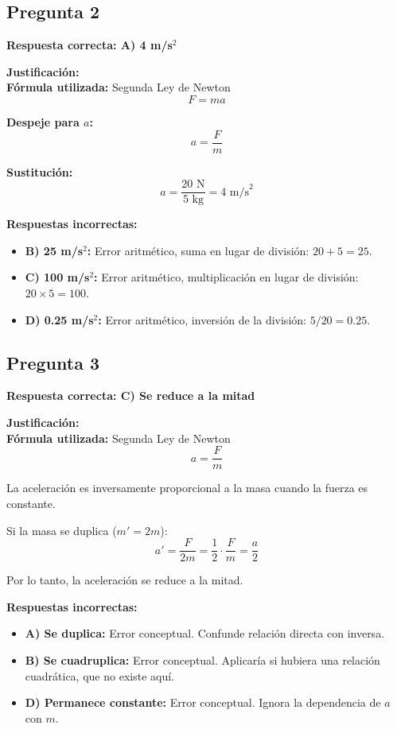 \begin{respuestabox}

\subsection{Pregunta 2}
\textcolor{verdecorrecto}{\textbf{Respuesta correcta: A) 4 m/s$^2$}}

\textbf{Justificación:}\\
\textbf{Fórmula utilizada:} Segunda Ley de Newton
$$F = ma$$

\textbf{Despeje para $a$:}
$$a = \frac{F}{m}$$

\textbf{Sustitución:}
$$a = \frac{20 \text{ N}}{5 \text{ kg}} = 4 \text{ m/s}^2$$

\textbf{Respuestas incorrectas:}
\begin{itemize}
    \item \textbf{B) 25 m/s$^2$:} Error aritmético, suma en lugar de división: $20 + 5 = 25$.
    \item \textbf{C) 100 m/s$^2$:} Error aritmético, multiplicación en lugar de división: $20 \times 5 = 100$.
    \item \textbf{D) 0.25 m/s$^2$:} Error aritmético, inversión de la división: $5/20 = 0.25$.
\end{itemize}
\end{respuestabox}
\newpage
\begin{respuestabox}

\subsection{Pregunta 3}
\textcolor{verdecorrecto}{\textbf{Respuesta correcta: C) Se reduce a la mitad}}

\textbf{Justificación:}\\
\textbf{Fórmula utilizada:} Segunda Ley de Newton
$$a = \frac{F}{m}$$

La aceleración es inversamente proporcional a la masa cuando la fuerza es constante.

Si la masa se duplica ($m' = 2m$):
$$a' = \frac{F}{2m} = \frac{1}{2} \cdot \frac{F}{m} = \frac{a}{2}$$

Por lo tanto, la aceleración se reduce a la mitad.

\textbf{Respuestas incorrectas:}
\begin{itemize}
    \item \textbf{A) Se duplica:} Error conceptual. Confunde relación directa con inversa.
    \item \textbf{B) Se cuadruplica:} Error conceptual. Aplicaría si hubiera una relación cuadrática, que no existe aquí.
    \item \textbf{D) Permanece constante:} Error conceptual. Ignora la dependencia de $a$ con $m$.
\end{itemize}
\end{respuestabox}

